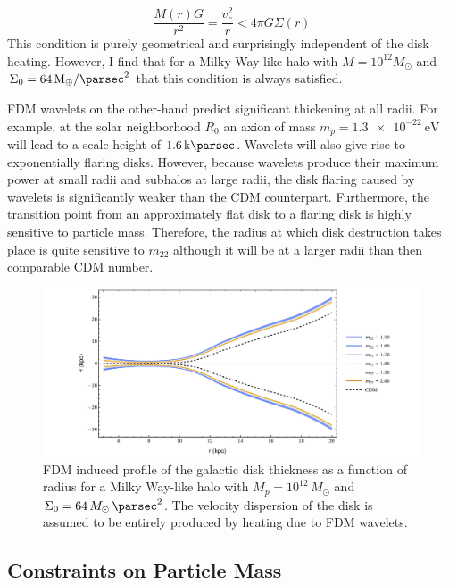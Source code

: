 \documentclass[usenatbib]{mnras}
\begin{document}
\begin{equation}
\frac{M(r) G}{r^2} = \frac{v_c^2}{r} < 4 \pi G \Sigma(r) 
\end{equation}   
This condition is purely geometrical and surprisingly independent of the disk heating. However, I find that for a Milky Way-like halo with $M = 10^{12} M_{\odot}$ and $\Sigma_0 = \SI{64}{M_{\oplus} \per \parsec \squared}$ that this condition is always satisfied. 
\par
	FDM wavelets on the other-hand predict significant thickening at all radii. For example, at the solar neighborhood $R_0$ an axion of mass $m_p = \SI{1.3 e-22}{\electronvolt}$ will lead to a scale height of $\SI{1.6}{ \kilo\parsec}$. Wavelets will also give rise to exponentially flaring disks. However, because wavelets produce their maximum power at small radii and subhalos at large radii, the disk flaring caused by wavelets is significantly weaker than the CDM counterpart. Furthermore, the transition point from an approximately flat disk to a flaring disk is highly sensitive to particle mass. Therefore, the radius at which disk destruction takes place is quite sensitive to $m_{22}$ although it will be at a larger radii than then comparable CDM number. 


\begin{figure}
\includegraphics[width=13cm]{disk_shape_FDM}
\vspace*{-5mm}
\caption{FDM induced profile of the galactic disk thickness as a function of radius for a Milky Way-like halo with $M_p = 10^{12} \, M_\odot$ and $\Sigma_0 = 64 \, M_\odot \, \si{\per\parsec^2}$. The velocity dispersion of the disk is assumed to be entirely produced by heating due to FDM wavelets. }
\label{fig:disk_shape_FDM}
\end{figure}

\subsection{Constraints on Particle Mass}
\end{document}

